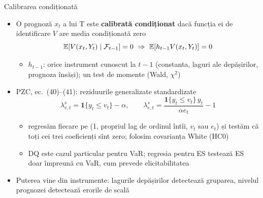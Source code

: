 \begin{frame}{Calibrarea condiționată}
\itemsize{\small}
\begin{itemize}
    \item O prognoză $x_t$ a lui $\mathrm T$ este \textbf{calibrată condiționat} dacă funcția ei de identificare $V$ are media condiționată zero 
    \[ \mathbb{E}[V(x_t, Y_t) \mid \mathcal F_{t-1}] = 0 \ \Rightarrow\ \mathbb{E}[h_{t-1}V(x_t, Y_t)] = 0 \]
    \begin{itemize}
        \item $h_{t-1}$: orice instrument cunoscut la $t-1$ (constanta, laguri ale depășirilor, prognoza însăși); un test de momente (Wald, $\chi^2$)
    \end{itemize}
    \item PZC, ec.~(40)--(41): reziduurile generalizate standardizate
    \[ \lambda^s_{v,t} = \mathbf 1\{y_t \le v_t\} - \alpha, \qquad \lambda^s_{e,t} = \frac{\mathbf 1\{y_t \le v_t\}\,y_t}{\alpha e_t} - 1 \]
    \begin{itemize}
        \item regresăm fiecare pe (1, propriul lag de ordinul întîi, $v_t$ sau $e_t$) și testăm că toți cei trei coeficienți sînt zero; folosim covarianța White (HC0)
        \item DQ este cazul particular pentru VaR; regresia pentru ES testează ES doar împreună cu VaR, cum prevede elicitabilitatea
    \end{itemize}
    \item Puterea vine din instrumente: lagurile depășirilor detectează gruparea, nivelul prognozei detectează erorile de scală
\end{itemize}
\end{frame}

